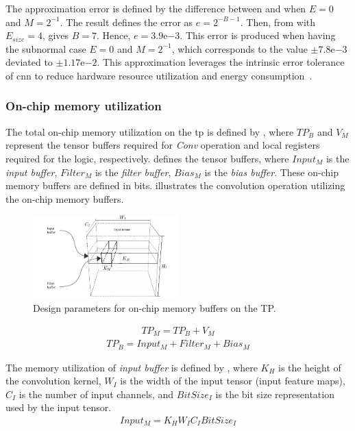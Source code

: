 The approximation error is defined by the difference between  and  when $E=0$ and $M=2^{-1}$. The result defines the error as $e=2^{-B-1}$. Then, from  with $E_{size}=4$, gives $B=7$. Hence, $e=3.9\mathrm{e}{-3}$. This error is produced when having the subnormal case $E=0$ and $M=2^{-1}$, which corresponds to the value $\pm7.8\mathrm{e}{-3}$ deviated to $\pm1.17\mathrm{e}{-2}$. This approximation leverages the intrinsic error tolerance of \gls{cnn} to reduce hardware resource utilization and energy consumption~\cite{du2014leveraging}.


\subsubsection{On-chip memory utilization}
\label{sec:memory_utilization}
The total on-chip memory utilization on the \gls{tp} is defined by , where $TP_B$ and $V_{M}$ represent the tensor buffers required for \emph{Conv} operation and local registers required for the logic, respectively.  defines the tensor buffers, where $Input_{M}$ is the \emph{input buffer}, $Filter_{M}$ is the \emph{filter buffer}, $Bias_{M}$ is the \emph{bias buffer}. These on-chip memory buffers are defined in bits.  illustrates the convolution operation utilizing the on-chip memory buffers.
\begin{figure}[t!]
	\centering
	\includegraphics[width=0.5\textwidth]{./chapters/cnn_accelerator/figures/accelerator_buffers.pdf}
	\caption{Design parameters for on-chip memory buffers on the TP.}
	\label{fig:accelerator_buffers}
\end{figure}
\begin{eqnarray} \label{eq:tp_memory}
TP_{M}=TP_B+V_{M}
\end{eqnarray}
\begin{eqnarray} \label{eq:tp_memory_buffer}
TP_{B}=Input_{M}+Filter_{M}+Bias_{M}
\end{eqnarray}

The memory utilization of \emph{input buffer} is defined by , where $K_{H}$ is the height of the convolution kernel, $W_{I}$ is the width of the input tensor (input feature maps), $C_{I}$ is the number of input channels, and $BitSize_{I}$ is the bit size representation used by the input tensor.
\begin{eqnarray} \label{eq:input_memory}
Input_{M}=K_{H}W_{I}C_{I}BitSize_{I}
\end{eqnarray}

